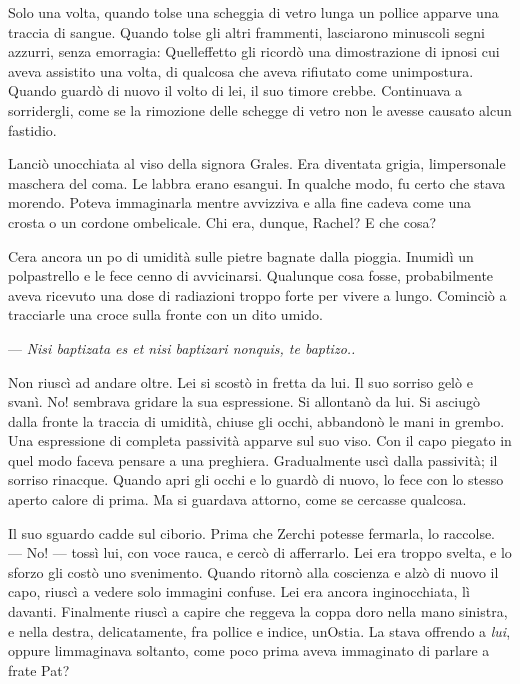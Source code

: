 Solo una volta, quando tolse una scheggia di vetro lunga un pollice
apparve una traccia di sangue. Quando tolse gli altri frammenti,
lasciarono minuscoli segni azzurri, senza emorragia:
Quell\textquotesingle effetto gli ricordò una dimostrazione di ipnosi
cui aveva assistito una volta, di qualcosa che aveva rifiutato come
un\textquotesingle impostura. Quando guardò di nuovo il volto di lei, il
suo timore crebbe. Continuava a sorridergli, come se la rimozione delle
schegge di vetro non le avesse causato alcun fastidio.

Lanciò un\textquotesingle occhiata al viso della signora Grales. Era
diventata grigia, l\textquotesingle impersonale maschera del coma. Le
labbra erano esangui. In qualche modo, fu certo che stava morendo.
Poteva immaginarla mentre avvizziva e alla fine cadeva come una crosta o
un cordone ombelicale. Chi era, dunque, Rachel? E che cosa?

C\textquotesingle era ancora un po\textquotesingle{} di umidità sulle
pietre bagnate dalla pioggia. Inumidì un polpastrello e le fece cenno di
avvicinarsi. Qualunque cosa fosse, probabilmente aveva ricevuto una dose
di radiazioni troppo forte per vivere a lungo. Cominciò a tracciarle una
croce sulla fronte con un dito umido.

--- \emph{Nisi baptizata es et nisi baptizari nonquis, te baptizo..}

Non riuscì ad andare oltre. Lei si scostò in fretta da lui. Il suo
sorriso gelò e svanì. No! sembrava gridare la sua espressione. Si
allontanò da lui. Si asciugò dalla fronte la traccia di umidità, chiuse
gli occhi, abbandonò le mani in grembo. Una espressione di completa
passività apparve sul suo viso. Con il capo piegato in quel modo faceva
pensare a una preghiera. Gradualmente uscì dalla passività; il sorriso
rinacque. Quando apri gli occhi e lo guardò di nuovo, lo fece con lo
stesso aperto calore di prima. Ma si guardava attorno, come se cercasse
qualcosa.

Il suo sguardo cadde sul ciborio. Prima che Zerchi potesse fermarla, lo
raccolse. --- No! --- tossì lui, con voce rauca, e cercò di afferrarlo.
Lei era troppo svelta, e lo sforzo gli costò uno svenimento. Quando
ritornò alla coscienza e alzò di nuovo il capo, riuscì a vedere solo
immagini confuse. Lei era ancora inginocchiata, lì davanti. Finalmente
riuscì a capire che reggeva la coppa d\textquotesingle oro nella mano
sinistra, e nella destra, delicatamente, fra pollice e indice,
un\textquotesingle Ostia. La stava offrendo a \emph{lui}, oppure
l\textquotesingle immaginava soltanto, come poco prima aveva immaginato
di parlare a frate Pat?


